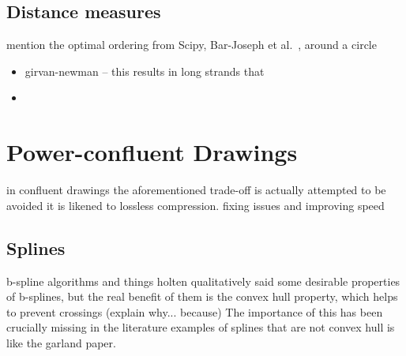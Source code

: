 \subsection{Distance measures}

mention the optimal ordering from Scipy, Bar-Joseph et al.~\cite{TODO}, around a circle

\begin{itemize}
    \item girvan-newman -- this results in long strands that \item
\end{itemize}

\section{Power-confluent Drawings}
in confluent drawings the aforementioned trade-off is actually attempted to be avoided
it is likened to lossless compression.
fixing issues and improving speed
\subsection{Splines}
b-spline algorithms and things
holten qualitatively said some desirable properties of b-splines, but the real benefit of them is the convex hull property, which helps to prevent crossings (explain why... because)
The importance of this has been crucially missing in the literature
examples of splines that are not convex hull is like the garland paper.
